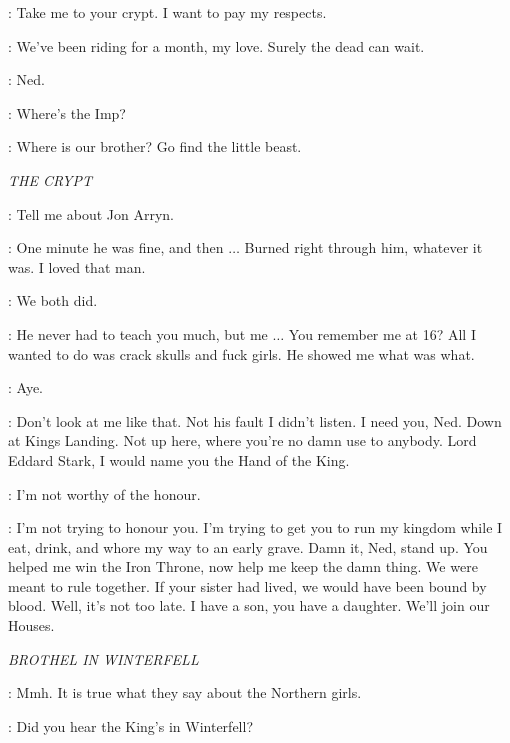 \ROBERT: Take me to your crypt. I want to pay my respects. 

\CERSEI: We've been riding for a month, my love. Surely the dead can wait. 

\ROBERT: Ned. 


\ARYA: Where's the Imp? 


\CERSEI: Where is our brother? Go find the little beast. 


\scene

\textit{THE CRYPT} 


\NED: Tell me about Jon Arryn. 

\ROBERT: One minute he was fine, and then $\ldots$ Burned right through him, whatever it was. I loved that man. 

\NED: We both did. 

\ROBERT: He never had to teach you much, but me $\ldots$ You remember me at 16? All I wanted to do was crack skulls and fuck girls. He showed me what was what. 

\NED: Aye. 

\ROBERT: Don't look at me like that. Not his fault I didn't listen.  I need you, Ned. Down at Kings Landing. Not up here, where you're no damn use to anybody. Lord Eddard Stark, I would name you the Hand of the King. 


\NED: I'm not worthy of the honour. 

\ROBERT: I'm not trying to honour you. I'm trying to get you to run my kingdom while I eat, drink, and whore my way to an early grave. Damn it, Ned, stand up. You helped me win the Iron Throne, now help me keep the damn thing. We were meant to rule together. If your sister had lived, we would have been bound by blood. Well, it's not too late. I have a son, you have a daughter. We'll join our Houses. 


\scene

\textit{BROTHEL IN WINTERFELL} 


\TYRION: Mmh. It is true what they say about the Northern girls. 

\ROS: Did you hear the King's in Winterfell? 

